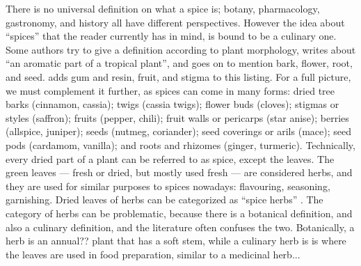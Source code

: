 There is no universal definition on what a spice is; botany, pharmacology, gastronomy, and history all have different perspectives. However the idea about ``spices'' that the reader currently has in mind, is bound to be a culinary one. Some authors try to give a definition according to plant morphology, \textcite[9]{czarra_spices_2009} writes about ``an aromatic part of a tropical plant'', and goes on to mention bark, flower, root, and seed. \textcite[xix]{turner_spice_2004} adds gum and resin, fruit, and stigma to this listing. For a full picture, we must complement it further, as spices can come in many forms: dried tree barks (cinnamon, cassia); twigs
(cassia twigs); flower buds (cloves); stigmas or styles (saffron); fruits (pepper, chili); fruit walls or pericarps (star anise); berries (allspice, juniper); seeds (nutmeg, coriander); seed coverings or arils (mace); seed pods (cardamom, vanilla); and roots and rhizomes (ginger, turmeric). Technically, every dried part of a plant can be referred to as spice, except the leaves. The green leaves --– fresh or dried, but mostly used fresh --– are considered herbs, and they are used for similar purposes to spices nowadays: flavouring, seasoning, garnishing. Dried leaves of herbs can be categorized as ``spice herbs'' \parencite[see][]{van_wyk_culinary_2014}. The category of herbs can be problematic, because there is a botanical definition, and also a culinary definition, and the literature often confuses the two. Botanically, a herb is an annual?? plant that has a soft stem, while a culinary herb is is where the leaves are used in food preparation, similar to a medicinal herb...

